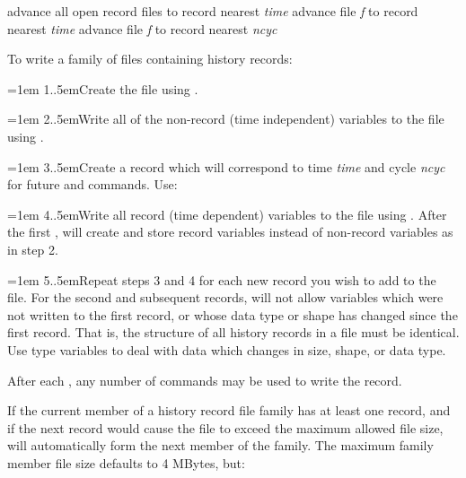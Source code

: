      {advance all open record files to record nearest {\it time}}
     {advance file {\it f\/} to record nearest {\it time}}
     {advance file {\it f\/} to record nearest {\it ncyc}}


To write a family of files containing history records:

\hangindent=1em
1.\hglue.5emCreate the file using .

\hangindent=1em
2.\hglue.5emWrite all of the non-record (time independent) variables to the
file using .

\hangindent=1em
3.\hglue.5emCreate a record which will correspond to time {\it time} and cycle
{\it ncyc} for future  and  commands.  Use:


\hangindent=1em
4.\hglue.5emWrite all record (time dependent) variables to the file using
.  After the first ,  will create and
store record variables instead of non-record variables as in step 2.

\hangindent=1em
5.\hglue.5emRepeat steps 3 and 4 for each new record you wish to add to the
file.  For the second and subsequent records,  will not allow
variables which were not written to the first record, or whose data type or
shape has changed since the first record.  That is, the structure of all
history records in a file must be identical.  Use type  variables
to deal with data which changes in size, shape, or data type.

After each , any number of  commands may be used
to write the record.

If the current member of a history record file family has at least one
record, and if the next record would cause the file to exceed the maximum
allowed file size,  will automatically form the next member
of the family.  The maximum family member file size defaults to 4 MBytes, but:



